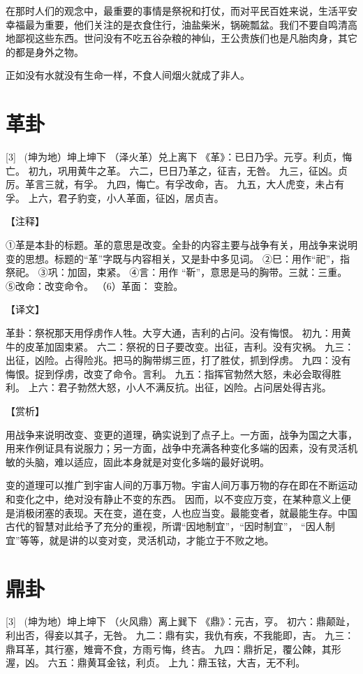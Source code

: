 \documentclass[12pt,UTF8]{ctexbook}
\begin{document}
在那时人们的观念中，最重要的事情是祭祝和打仗，而对平民百姓来说，生活平安幸福最为重要，他们关注的是衣食住行，油盐柴米，锅碗瓢盆。我们不要自鸣清高地鄙视这些东西。世问没有不吃五谷杂粮的神仙，王公贵族们也是凡胎肉身，其它的都是身外之物。

正如没有水就没有生命一样，不食人间烟火就成了非人。

\chapter{革卦}
[3] \ (坤为地）坤上坤下
（泽火革）兑上离下
《革》：已日乃孚。元亨。利贞，悔亡。
初九，巩用黄牛之革。
六二，巳日乃革之，征吉，无咎。
九三，征凶。贞厉。革言三就，有孚。
九四，悔亡。有孚改命，吉。
九五，大人虎变，未占有孚。
上六，君子豹变，小人革面，征凶，居贞吉。

【注释】

①革是本卦的标题。革的意思是改变。全卦的内容主要与战争有关，用战争来说明变的思想。标题的“革”字既与内容相关，又是卦中多见词。
②巳：用作“祀”，指祭祀。
③巩：加固，束紧。
④言：用作 “靳”，意思是马的胸带。三就：三重。
⑤改命：改变命令。
（6）革面： 变脸。

【译文】

革卦：祭祝那天用俘虏作人牲。大亨大通，吉利的占问。没有悔恨。
初九：用黄牛的皮革加固束紧。
六二：祭祝的日子要改变。出征，吉利。没有灾祸。
九三：出征，凶险。占得险兆。把马的胸带绑三匝，打了胜仗，抓到俘虏。
九四：没有悔恨。捉到俘虏，改变了命令。言利。
九五：指挥官勃然大怒，未必会取得胜利。
上六：君子勃然大怒，小人不满反抗。出征，凶险。占问居处得吉兆。

【赏析】

用战争来说明改变、变更的道理，确实说到了点子上。一方面，战争为国之大事，用来作例证具有说服力；另一方面，战争中充满各种变化多端的因素，没有灵活机敏的头脑，难以适应，固此本身就是对变化多端的最好说明。

变的道理可以推广到宇宙人间的万事万物。宇宙人间万事万物的存在即在不断运动和变化之中，绝对没有静止不变的东西。 因而，以不变应万变，在某种意义上便是消极闭塞的表现。天在变，道在变，人也应当变。最能变者，就最能生存。中国古代的智慧对此给予了充分的重视，所谓“因地制宜”，“因时制宜”， “因人制宜”等等，就是讲的以变对变，灵活机动，才能立于不败之地。

\chapter{鼎卦}
[3] \ (坤为地）坤上坤下
（火风鼎）离上巽下
《鼎》：元吉，亨。
初六：鼎颠趾，利出否，得妾以其子，无咎。
九二：鼎有实，我仇有疾，不我能即，吉。
九三：鼎耳革，其行塞，雉膏不食，方雨亏悔，终吉。
九四：鼎折足，覆公餗，其形渥，凶。
六五：鼎黄耳金铉，利贞。
上九：鼎玉铉，大吉，无不利。
\end{document}
